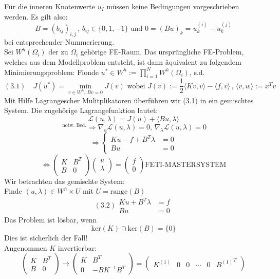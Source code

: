\begin{enumerate}
Für die inneren Knotenwerte $u_I$ müssen keine Bedingungen vorgeschrieben werden. Es gilt also:
\[ B=(b_{ij})_{i,j}\, , \, b_{ij}\in \{ 0,1,-1 \} \text{ und } 0 = (Bu)_k=u^{(i)}_k - u^{(j)}_k \]
bei entsprechender Nummerierung.\\
Sei $W^h(\Omega_i)$ der zu $\Omega_i$ gehörige FE-Raum. Das ursprüngliche FE-Problem, welches aus dem Modellproblem entsteht, ist dann äquivalent zu folgendem Minimierungsproblem:
Fionde $u^* \in W^h := \prod_{i=1}^N W^h (\Omega_i)$, s.d.
\[(3.1) \quad J(u^*) = \min_{v \in W^h, \, Bv=0} J(v) \text{ wobei } J(v):=\frac{1}{2} \langle Kv,v\rangle - \langle f,v \rangle\, , \, \langle v , w \rangle := x^Tv \]
Mit Hilfe Lagrangescher Mulitplikatoren überführen wir (3.1) in ein gemischtes System. Die zugehörige Lagrangefunktion lautet:
\[ \mathcal{L}(u,\lambda)=J(u)+\langle Bu,\lambda \rangle \]
\[^{\text{ notw. Bed.}}\Rightarrow \nabla_u \mathcal{L} (u,\lambda)=0,\, \nabla_\lambda \mathcal{L} (u,\lambda)=0  \]
\[\Rightarrow \begin{cases} Ku-f+B^T\lambda &=0 \\ Bu &= 0 \end{cases} \]
\[ \Leftrightarrow \begin{pmatrix} K & B^T \\ B & 0 \end{pmatrix} \begin{pmatrix}u \\ \lambda \end{pmatrix} = \begin{pmatrix} f \\ 0 \end{pmatrix}  \boxed{\text{FETI-MASTERSYSTEM}} \]
Wir betrachten das gemischte System:\\
Finde $(u,\lambda) \in W^h \times U $ mit $U=\text{range}(B)$
\begin{equation}
(3.2) \begin{aligned}Ku+B^T\lambda &= f \\ Bu &= 0 \end{aligned}
\end{equation}
Das Problem ist lösbar, wenn
\[ \text{ker}(K)\cap \text{ker}(B) = \{ 0 \} \]
Dies ist sicherlich der Fall!\\
Angenommen $K$ invertierbar:
\[ \begin{pmatrix} K & B^T \\ B & 0 \end{pmatrix} \rightarrow  \begin{pmatrix} K & B^T \\ 0 & -BK^{-1}B^T \end{pmatrix} = \begin{pmatrix}   K^{(1)} & 0 & 0 & \cdots & 0 & {B^{(1)}}^T \\

\end{pmatrix}\]
\end{enumerate}
